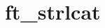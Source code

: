\chapter{ft\+\_\+strlcat}
\hypertarget{md_Documentation_2ft__strlcat}{}\label{md_Documentation_2ft__strlcat}

